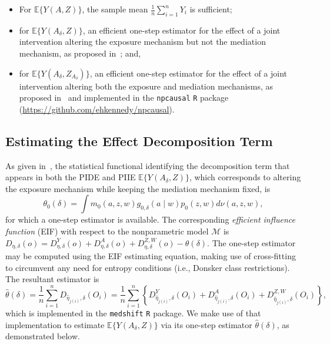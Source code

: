 \begin{itemize}
\item For $\mathbb{E}\{Y(A, Z)\}$, the sample mean $\frac{1}{n}\sum_{i=1}^n
  Y_i$ is sufficient;
\item for $\mathbb{E}\{Y(A_{\delta}, Z)\}$, an efficient one-step estimator for
  the effect of a joint intervention altering the exposure mechanism but not the
  mediation mechanism, as proposed in~\citet{diaz2020causal}; and,
\item for $\mathbb{E}\{Y(A_{\delta}, Z_{A_{\delta}})\}$, an efficient one-step
  estimator for the effect of a joint intervention altering both the exposure
  and mediation mechanisms, as proposed in~\citet{kennedy2017nonparametric} and
  implemented in the \texttt{npcausal} \texttt{R}
  package (\url{https://github.com/ehkennedy/npcausal}).
\end{itemize}

\subsection{Estimating the Effect Decomposition Term}

As given in~\citet{diaz2020causal}, the statistical functional identifying the
decomposition term that appears in both the PIDE and PIIE
$\mathbb{E}\{Y(A_{\delta}, Z)\}$, which corresponds to altering the exposure
mechanism while keeping the mediation mechanism fixed, is
\begin{equation*}
  \theta_0(\delta) = \int m_0(a, z, w) g_{0,\delta}(a \mid w) p_0(z, w)
    d\nu(a, z, w),
\end{equation*}
for which a one-step estimator is available. The corresponding \textit{efficient
influence function} (EIF) with respect to the nonparametric model $\mathcal{M}$
is $D_{\eta,\delta}(o) = D^Y_{\eta,\delta}(o)
+ D^A_{\eta,\delta}(o) + D^{Z,W}_{\eta,\delta}(o) - \theta(\delta)$. The
one-step estimator may be computed using the EIF estimating equation, making use
of cross-fitting~\citep{zheng2011cross,chernozhukov2018double} to circumvent any
need for entropy conditions (i.e., Donsker class restrictions). The resultant
estimator is
\begin{equation*}
  \hat{\theta}(\delta) = \frac{1}{n} \sum_{i = 1}^n D_{\hat{\eta}_{j(i)},
  \delta}(O_i) = \frac{1}{n} \sum_{i = 1}^n \left\{ D^Y_{\hat{\eta}_{j(i)},
  \delta}(O_i) + D^A_{\hat{\eta}_{j(i)}, \delta}(O_i) +
  D^{Z,W}_{\hat{\eta}_{j(i)}, \delta}(O_i) \right\},
\end{equation*}
which is implemented in the \texttt{medshift} \texttt{R} package. We make use of
that implementation to estimate $\mathbb{E}\{Y(A_{\delta}, Z)\}$ via its
one-step estimator $\hat{\theta}(\delta)$, as demonstrated below.

